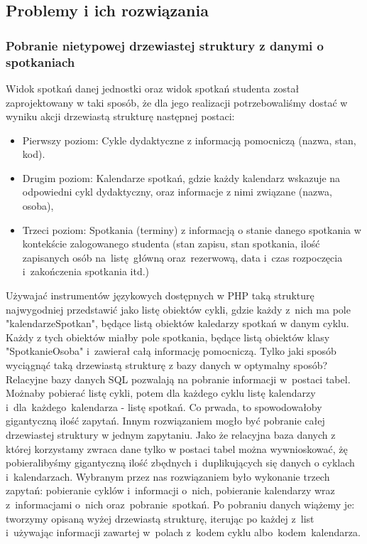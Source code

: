 \documentclass[licencjacka]{pracamgr}
\begin{document}
\subsection{Problemy i ich rozwiązania}
\subsubsection{Pobranie nietypowej drzewiastej struktury z danymi o spotkaniach}
Widok spotkań danej jednostki oraz widok spotkań studenta został zaprojektowany w taki sposób, że dla jego realizacji potrzebowaliśmy dostać w wyniku akcji drzewiastą strukturę następnej postaci:

\begin{itemize}
\item{Pierwszy poziom: Cykle dydaktyczne z informacją pomocniczą (nazwa, stan, kod).}
\item{Drugim poziom: Kalendarze spotkań, gdzie każdy kalendarz wskazuje na odpowiedni cykl dydaktyczny, oraz informacje z nimi związane (nazwa, osoba),}
\item{Trzeci poziom: Spotkania (terminy) z informacją o stanie danego spotkania w kontekście zalogowanego studenta (stan zapisu, stan spotkania, ilość zapisanych osób na~listę~główną oraz~rezerwową, data i~czas rozpoczęcia i~zakończenia spotkania itd.)}
\end{itemize}
Używajać instrumentów językowych dostępnych w PHP taką strukturę najwygodniej przedstawić jako listę obiektów cykli, gdzie każdy z~nich ma pole "kalendarzeSpotkan", będące listą obiektów kaledarzy spotkań w danym cyklu. Każdy z tych obiektów miałby pole spotkania, będące listą obiektów klasy "SpotkanieOsoba" i~zawierał całą informację pomocniczą. 
Tylko jaki sposób wyciągnąć taką drzewiastą strukturę z bazy danych w optymalny sposób? Relacyjne bazy danych SQL pozwalają na pobranie informacji w~postaci tabel. Możnaby pobierać listę cykli, potem dla każdego cyklu listę kalendarzy i~dla~każdego~kalendarza - listę spotkań. Co prwada, to spowodowałoby gigantyczną ilość zapytań. Innym rozwiązaniem mogło być pobranie całej drzewiastej struktury w jednym zapytaniu. Jako że relacyjna baza danych z której korzystamy zwraca dane tylko w postaci tabel można wywnioskować, żę pobieralibyśmy gigantyczną ilość zbędnych i~duplikujących się danych o cyklach i~kalendarzach. Wybranym przez nas rozwiązaniem było wykonanie trzech zapytań: pobieranie cyklów i~informacji o~nich, pobieranie kalendarzy wraz z~informacjami o~nich oraz~pobranie~spotkań. Po pobraniu danych wiążemy je: tworzymy opisaną wyżej drzewiastą strukturę, iterując po każdej z~list i~używając informacji zawartej w~polach z~kodem cyklu albo~kodem~kalendarza.
\end{document}
